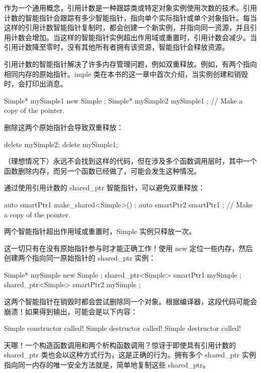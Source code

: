 作为一个通用概念，引用计数是一种跟踪类或特定对象实例使用次数的技术。引用计数的智能指针会跟踪有多少智能指针，指向单个实际指针或单个对象指针。每当这样的引用计数智能指针复制时，都会创建一个新实例，并指向同一资源，并且引用计数会增加。当这样的智能指针实例超出作用域或重置时，引用计数会减少。当引用计数降至零时，没有其他所有者拥有该资源，智能指针会释放资源。

引用计数的智能指针解决了许多内存管理问题，例如双重释放。例如，有两个指向相同内存的原始指针。imple 类在本书的这一章中首次介绍，当实例创建和销毁时，会打印出消息。

\begin{cpp}
Simple* mySimple1 { new Simple{} };
Simple* mySimple2 { mySimple1 }; // Make a copy of the pointer.
\end{cpp}

删除这两个原始指针会导致双重释放：

\begin{cpp}
delete mySimple2;
delete mySimple1;
\end{cpp}

（理想情况下）永远不会找到这样的代码，但在涉及多个函数调用层时，其中一个函数删除内存，而另一个函数已经做了，可能会发生这种情况。

通过使用引用计数的 shared\_ptr 智能指针，可以避免双重释放：

\begin{cpp}
auto smartPtr1 { make_shared<Simple>() };
auto smartPtr2 { smartPtr1 }; // Make a copy of the pointer.
\end{cpp}

两个智能指针超出作用域或重置时，Simple 实例只释放一次。

这一切只有在没有原始指针参与时才能正确工作！使用 new 定位一些内存，然后创建两个指向同一原始指针的 shared\_ptr 实例：

\begin{cpp}
Simple* mySimple { new Simple{} };
shared_ptr<Simple> smartPtr1 { mySimple };
shared_ptr<Simple> smartPtr2 { mySimple };
\end{cpp}

这两个智能指针在销毁时都会尝试删除同一个对象。根据编译器，这段代码可能会崩溃！如果得到输出，可能会是以下内容：

\begin{shell}
Simple constructor called!
Simple destructor called!
Simple destructor called!
\end{shell}

天哪！一个构造函数调用和两个析构函数调用？惊讶于即使具有引用计数的 shared\_ptr 类也会以这种方式行为，这是正确的行为。拥有多个 shared\_ptr 实例指向同一内存的唯一安全方法就是，简单地复制这些 shared\_ptr。

